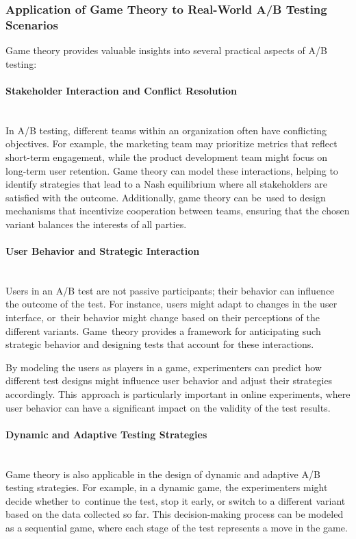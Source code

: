 \documentclass[magisterska, english]{pwr_wmat_praca_dyplomowa}
\theoremstyle{plain}
\numberwithin{theorem}{chapter}
\theoremstyle{definition}
\numberwithin{theorem}{chapter}
\newcommand{\myparagraph}[1]{\paragraph{#1}\mbox{}\\}
\begin{document}
\subsubsection{Application of Game Theory to Real-World A/B Testing Scenarios}

Game theory provides valuable insights into several practical aspects of A/B testing:

\myparagraph{Stakeholder Interaction and Conflict Resolution}

In A/B testing, different teams within an organization often have conflicting objectives. For example, the marketing team may prioritize metrics that reflect short-term engagement, while the product development team might focus on long-term user retention. Game theory can model these interactions, helping to identify strategies that lead to a Nash equilibrium where all stakeholders are satisfied with the outcome. Additionally, game theory can be~used to design mechanisms that incentivize cooperation between teams, ensuring that the chosen variant balances the interests of all parties.

\myparagraph{User Behavior and Strategic Interaction}

Users in an A/B test are not passive participants; their behavior can influence the outcome of the test. For instance, users might adapt to changes in the user interface, or~their behavior might change based on their perceptions of the different variants. Game~theory provides a framework for anticipating such strategic behavior and designing tests that account for these interactions.

By modeling the users as players in a game, experimenters can predict how different test designs might influence user behavior and adjust their strategies accordingly. This~approach is particularly important in online experiments, where user behavior can have a significant impact on the validity of the test results.

\myparagraph{Dynamic and Adaptive Testing Strategies}

Game theory is also applicable in the design of dynamic and adaptive A/B testing strategies. For example, in a dynamic game, the experimenters might decide whether to~continue the test, stop it early, or switch to a different variant based on the data collected so far. This decision-making process can be modeled as a sequential game, where each stage of the test represents a move in the game.
\end{document}

